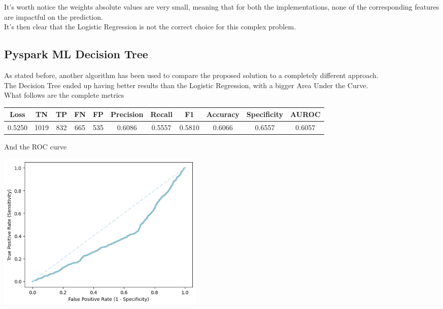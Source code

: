 \documentclass[
	letterpaper, %
	10pt, %
]{class}
\begin{document}
It's worth notice the weights absolute values are very small, meaning that for both the implementations, none of the corresponding features are impactful on the prediction.\\
It's then clear that the Logistic Regression is not the correct choice for this complex problem.

\subsection{Pyspark ML Decision Tree}

As stated before, another algorithm has been used to compare the proposed solution to a completely different approach.\\
The Decision Tree ended up having better results than the Logistic Regression, with a bigger Area Under the Curve.\\
What follows are the complete metrics

\begin{center}
    \begin{tabular}{ |c|c|c|c|c|c|c|c|c|c|c| }
        \hline
        Loss   & TN   & TP  & FN  & FP  & Precision & Recall & F1     & Accuracy & Specificity & AUROC  \\
        \hline
        0.5250 & 1019 & 832 & 665 & 535 & 0.6086    & 0.5557 & 0.5810 & 0.6066   & 0.6557      & 0.6057 \\
        \hline
    \end{tabular}
\end{center}

And the ROC curve

\begin{center}
    \includegraphics[width=10cm]{../images/tree_roc.png}
\end{center}
\end{document}
